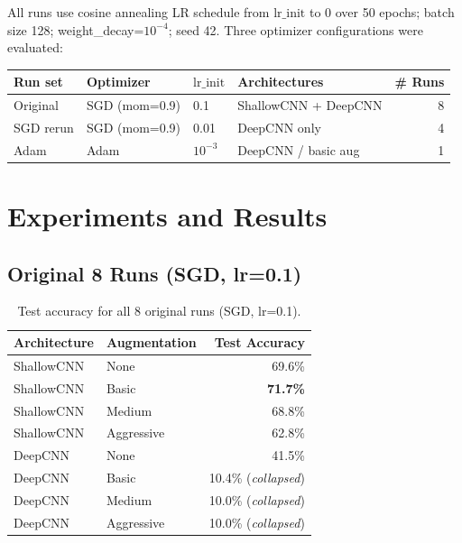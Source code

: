 \documentclass[11pt,letterpaper]{article}
\begin{document}
All runs use cosine annealing LR schedule from $\mathrm{lr\_init}$ to 0 over 50 epochs;
batch size 128; weight\_decay=$10^{-4}$; seed 42. Three optimizer configurations were evaluated:

\begin{center}
\begin{tabular}{llllr}
\toprule
Run set & Optimizer & $\mathrm{lr\_init}$ & Architectures & \# Runs \\
\midrule
Original & SGD (mom=0.9) & 0.1 & ShallowCNN + DeepCNN & 8 \\
SGD rerun & SGD (mom=0.9) & 0.01 & DeepCNN only & 4 \\
Adam & Adam & $10^{-3}$ & DeepCNN / basic aug & 1 \\
\bottomrule
\end{tabular}
\end{center}

\section{Experiments and Results}

\subsection{Original 8 Runs (SGD, lr=0.1)}

\begin{table}[H]
\centering
\caption{Test accuracy for all 8 original runs (SGD, lr=0.1).}
\label{tab:original}
\begin{tabular}{llr}
\toprule
Architecture & Augmentation & Test Accuracy \\
\midrule
ShallowCNN & None       & 69.6\% \\
ShallowCNN & Basic      & \textbf{71.7\%} \\
ShallowCNN & Medium     & 68.8\% \\
ShallowCNN & Aggressive & 62.8\% \\
\midrule
DeepCNN    & None       & 41.5\% \\
DeepCNN    & Basic      & 10.4\% \; (\textit{collapsed}) \\
DeepCNN    & Medium     & 10.0\% \; (\textit{collapsed}) \\
DeepCNN    & Aggressive & 10.0\% \; (\textit{collapsed}) \\
\bottomrule
\end{tabular}
\end{table}
\end{document}
